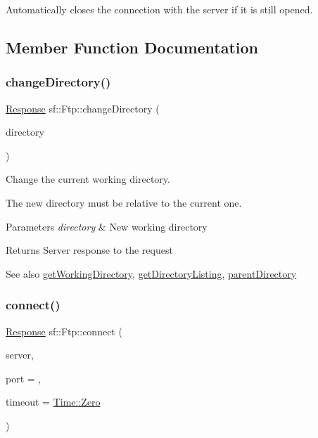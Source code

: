 Automatically closes the connection with the server if it is still opened. 

\subsection{Member Function Documentation}
\mbox{\label{classsf_1_1_ftp_a7e93488ea6330dd4dd76e428da9bb6d3}} 
\subsubsection{\texorpdfstring{change\+Directory()}{changeDirectory()}}
{\footnotesize\ttfamily \hyperlink{classsf_1_1_ftp_1_1_response}{Response} sf\+::\+Ftp\+::change\+Directory (\begin{DoxyParamCaption}\item[{const std\+::string \&}]{directory }\end{DoxyParamCaption})}



Change the current working directory. 

The new directory must be relative to the current one.


\begin{DoxyParams}{Parameters}
{\em directory} & New working directory\\
\hline
\end{DoxyParams}
\begin{DoxyReturn}{Returns}
Server response to the request
\end{DoxyReturn}
\begin{DoxySeeAlso}{See also}
\hyperlink{classsf_1_1_ftp_a79c654fcdd0c81e68c4fa29af3b45e0c}{get\+Working\+Directory}, \hyperlink{classsf_1_1_ftp_a8f37258e461fcb9e2a0655e9df0be4a0}{get\+Directory\+Listing}, \hyperlink{classsf_1_1_ftp_ad295cf77f30f9ad07b5c401fd9849189}{parent\+Directory} 
\end{DoxySeeAlso}
\mbox{\label{classsf_1_1_ftp_af02fb3de3f450a50a27981961c69c860}} 
\subsubsection{\texorpdfstring{connect()}{connect()}}
{\footnotesize\ttfamily \hyperlink{classsf_1_1_ftp_1_1_response}{Response} sf\+::\+Ftp\+::connect (\begin{DoxyParamCaption}\item[{const \hyperlink{classsf_1_1_ip_address}{Ip\+Address} \&}]{server,  }\item[{unsigned short}]{port = {},  }\item[{\hyperlink{classsf_1_1_time}{Time}}]{timeout = {\ttfamily \hyperlink{classsf_1_1_time_a8db127b632fa8da21550e7282af11fa0}{Time\+::\+Zero}} }\end{DoxyParamCaption})}



